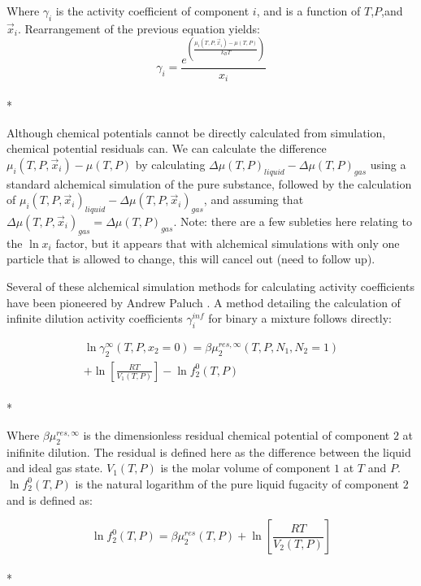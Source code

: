 \documentclass[aps,pre,twocolumn,nofootinbib,superscriptaddress,linenumbers,10pt, draft,tightenlines]{revtex4-1}
\begin{document}
Where $\gamma_i$ is the activity coefficient of component $i$, and is
a function of $T$,$P$,and $\vec{x}_i$.  Rearrangement of the previous
equation yields:
\begin{equation}\gamma_i = \frac{e^{\left(\frac{\mu_i(T,P,\vec{x}_i) - \mu(T,P)}{k_B T}\right)}}{x_i}\end{equation}\\*

Although chemical potentials cannot be directly calculated from
simulation, chemical potential residuals can. We can calculate the
difference $\mu_i(T,P,\vec{x}_i) - \mu(T,P)$ by calculating $\Delta
\mu(T,P)_{liquid} - \Delta \mu(T,P)_{gas}$ using a standard alchemical
simulation of the pure substance, followed by the calculation of
$\mu_i(T,P,\vec{x}_i)_{liquid} - \Delta \mu(T,P,\vec{x}_i)_{gas}$, and
assuming that $\Delta \mu(T,P,\vec{x}_i)_{gas} = \Delta
\mu(T,P)_{gas}$. Note: there are a few subleties here relating to the
$\ln x_i$ factor, but it appears that with alchemical simulations with
only one particle that is allowed to change, this will cancel out
(need to follow up).

Several of these alchemical simulation methods for calculating activity coefficients have been pioneered by Andrew Paluch \cite{paluch1}. A method detailing the calculation of infinite dilution activity coefficients $\gamma_i^{inf}$ for binary a mixture follows directly:

\begin{multline}
\ln\gamma_2^{\infty}\left(T,P,x_2 = 0\right) = \beta \mu_2^{res,\infty}\left(T,P,N_1,N_2 = 1\right) \\ + \ln\left[\frac{R T}{V_1\left(T,P\right)}\right] - \ln f_2^0\left(T,P\right)
\end{multline}\\*

Where $\beta\mu_2^{res,\infty}$ is the dimensionless residual chemical potential of component $2$ at inifinite dilution. The residual is defined here as the difference between the liquid and ideal gas state. $V_1\left(T,P\right)$ is the molar volume of component $1$ at $T$ and $P$. $\ln f_2^0\left(T,P\right)$ is the natural logarithm of the pure liquid fugacity of component $2$ and is defined as:

\begin{equation}\ln f_2^0\left(T,P\right) = \beta\mu_2^{res}\left(T,P\right) + \ln\left[\frac{R T}{V_2\left(T,P\right)}\right]\end{equation}\\*
\end{document}

